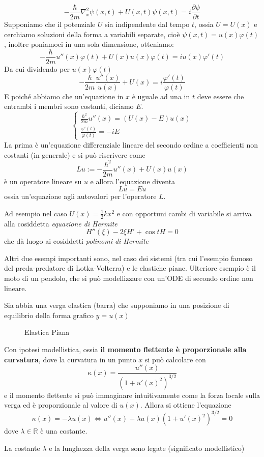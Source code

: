 \begin{example}
    \[
        -\frac{\hbar}{2m} \nabla^2_x \psi(x, t) + U(x, t)\psi(x, t) = i
        \frac{\partial \psi}{\partial t}
    \]
    Supponiamo che il potenziale \(U\) sia indipendente dal tempo \(t\), ossia
    \(U = U(x)\) e cerchiamo soluzioni della forma a variabili separate, cioè
    \(\psi(x, t) = u(x) \varphi(t)\), inoltre poniamoci in una sola dimensione,
    otteniamo:
    \[
        -\frac{\hbar}{2m} u''(x)\varphi(t) + U(x)u(x) \varphi(t) =
        iu(x)\varphi'(t)
    \]
    Da cui dividendo per \(u(x)\varphi(t)\) 
    \[
        -\frac{\hbar}{2m}\frac{u''(x)}{u(x)} + U(x) =
        i\frac{\varphi'(t)}{\varphi(t)}
    \]
    E poiché abbiamo che un'equazione in \(x\) è uguale ad una in \(t\) deve
    essere che entrambi i membri sono costanti, diciamo \(E\).
    \[
        \begin{cases}
            \frac{\hbar^2}{2m}u''(x) = (U(x) - E)u(x) \\
            \frac{\varphi'(t)}{\varphi(t)} = -iE
        \end{cases}
    \]
    La prima è un'equazione differenziale lineare del secondo ordine a
    coefficienti non costanti (in generale) e si può riscrivere come 
    \[
        Lu := -\frac{\hbar^2}{2m} u''(x) + U(x)u(x)
    \]
    è un operatore lineare su \(u\) e allora l'equazione diventa
    \[
        Lu = Eu
    \]
    ossia un'equazione agli autovalori per l'operatore \(L\).

    Ad esempio nel caso \(U(x) = \frac{1}{2}k x^2\) e con opportuni cambi di
    variabile si arriva alla cosiddetta \emph{equazione di Hermite}
    \[
        H''(\xi) - 2\xi H' + \cos t H = 0
    \]
    che dà luogo ai cosiddetti \emph{polinomi di Hermite}
\end{example}
Altri due esempi importanti sono, nel caso dei sistemi (tra cui l'esempio famoso
del preda-predatore di Lotka-Volterra) e le elastiche piane.
Ulteriore esempio è il moto di un pendolo, che si può modellizzare con un'ODE di
secondo ordine non lineare.
\begin{example}
    Sia abbia una verga elastica (barra) che supponiamo in una posizione di
    equilibrio della forma grafico \(y = u(x)\) 
\begin{figure}[ht]
    \centering
    \caption{Elastica Piana}\label{fig:elastica_piana}
\end{figure}
    Con ipotesi modellistica, ossia \textbf{il momento flettente è proporzionale
    alla curvatura}, dove la curvatura in un punto \(x\) si può calcolare con
    \[
        \kappa(x) = \frac{u''(x)}{{(1 + {u'(x)}^2)}^{3/2}}
    \]
    e il momento flettente si può immaginare intuitivamente come la forza locale
    sulla verga ed è proporzionale al valore di \(u(x)\). Allora si ottiene
    l'equazione
    \[
        \kappa(x) = -\lambda u(x) \iff u''(x) + \lambda u(x){(1 +
        {u'(x)}^2)}^{3/2} = 0
    \]
    dove \(\lambda \in \mathbb{R}\) è una costante.
\begin{remark}
    La costante \(\lambda\) e la lunghezza della verga sono legate (significato
    modellistico)
\end{remark}
\end{example} 
